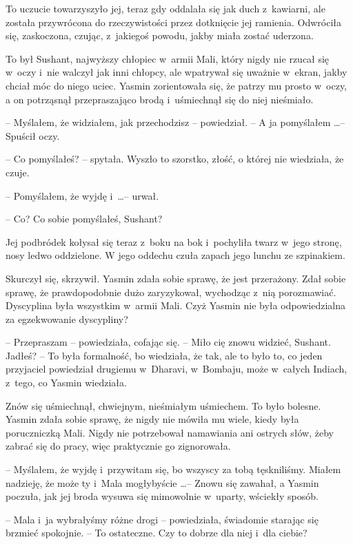 \documentclass[oneside,polish,11pt,rmheadings]{mwbk}
\begin{document}
To uczucie towarzyszyło jej, teraz gdy oddalała się jak duch z~kawiarni, ale została przywrócona do rzeczywistości przez dotknięcie jej ramienia. Odwróciła się, zaskoczona, czując, z~jakiegoś powodu, jakby miała zostać uderzona.

To był Sushant, najwyższy chłopiec w~armii Mali, który nigdy nie rzucał się w~oczy i~nie walczył jak inni chłopcy, ale wpatrywał się uważnie w~ekran, jakby chciał móc do niego uciec. Yasmin zorientowała się, że patrzy mu prosto w~oczy, a on potrząsnął przepraszająco brodą i~uśmiechnął się do niej nieśmiało.

-- Myślałem, że widziałem, jak przechodzisz -- powiedział. -- A ja pomyślałem \ldots  -- Spuścił oczy.

-- Co pomyślałeś? -- spytała. Wyszło to szorstko, złość, o której nie wiedziała, że czuje.

-- Pomyślałem, że wyjdę i~\ldots  -- urwał.

-- Co? Co sobie pomyślałeś, Sushant? 

Jej podbródek kołysał się teraz z~boku na bok i~pochyliła twarz w~jego stronę, nosy ledwo oddzielone. W jego oddechu czuła zapach jego lunchu ze szpinakiem.

Skurczył się, skrzywił. Yasmin zdała sobie sprawę, że jest przerażony. Zdał sobie sprawę, że prawdopodobnie dużo zaryzykował, wychodząc z~nią porozmawiać. Dyscyplina była wszystkim w~armii Mali. Czyż Yasmin nie była odpowiedzialna za egzekwowanie dyscypliny?

-- Przepraszam -- powiedziała, cofając się. -- Miło cię znowu widzieć, Sushant. Jadłeś? -- To była formalność, bo wiedziała, że tak, ale to było to, co jeden przyjaciel powiedział drugiemu w~Dharavi, w~Bombaju, może w~całych Indiach, z~tego, co Yasmin wiedziała.

Znów się uśmiechnął, chwiejnym, nieśmiałym uśmiechem. To było bolesne. Yasmin zdała sobie sprawę, że nigdy nie mówiła mu wiele, kiedy była poruczniczką Mali. Nigdy nie potrzebował namawiania ani ostrych słów, żeby zabrać się do pracy, więc praktycznie go zignorowała. 

-- Myślałem, że wyjdę i~przywitam się, bo wszyscy za tobą tęskniliśmy. Miałem nadzieję, że może ty i~Mala mogłybyście \ldots  -- Znowu się zawahał, a Yasmin poczuła, jak jej broda wysuwa się mimowolnie w~uparty, wściekły sposób.

-- Mala i~ja wybrałyśmy różne drogi -- powiedziała, świadomie starając się brzmieć spokojnie. -- To ostateczne. Czy to dobrze dla niej i~dla ciebie?
\end{document}
